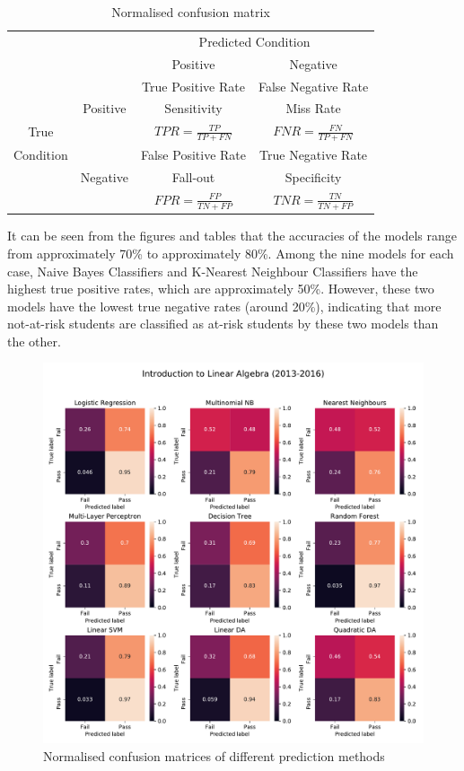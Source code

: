 \documentclass[a4paper]{report}
\begin{document}
\begin{table}[ht]
  \centering
  \begin{tabular}{c|c|c|c}
    \hline
    \multicolumn{2}{c|}{} & \multicolumn{2}{c}{Predicted Condition} \\ 
    \cline{3-4}
    \multicolumn{2}{c|}{} & Positive & Negative \\ 
    \hline
  & & True Positive Rate & False Negative Rate \\ 
  & Positive & Sensitivity & Miss Rate \\ 
  True & & $\displaystyle TPR = \frac{TP}{TP+FN}$ & $\displaystyle FNR = \frac{FN}{TP+FN}$ \\
    \cline{2-4}
    Condition & & False Positive Rate & True Negative Rate \\ 
    & Negative & Fall-out & Specificity \\
    & & $\displaystyle FPR = \frac{FP}{TN+FP}$ & $\displaystyle TNR = \frac{TN}{TN+FP}$ \\
     \hline
  \end{tabular}
  \caption{\label{tab:cm_norm}Normalised confusion matrix}
\end{table}

It can be seen from the figures and tables that the accuracies of the models range from approximately 70\% to approximately 80\%. Among the nine models for each case, Naive Bayes Classifiers and K-Nearest Neighbour Classifiers have the highest true positive rates, which are approximately 50\%. However, these two models have the lowest true negative rates (around 20\%), indicating that more not-at-risk students are classified as at-risk students by these two models than the other. 

\newpage
\begin{figure}[H]
  \centering
  \includegraphics[width=\linewidth]{fig/ML_ILA_bin_pre17.pdf}
  \caption{\label{fig:ML_ILA_bin_pre17}Normalised confusion matrices of different prediction methods}
\end{figure}
\end{document}
